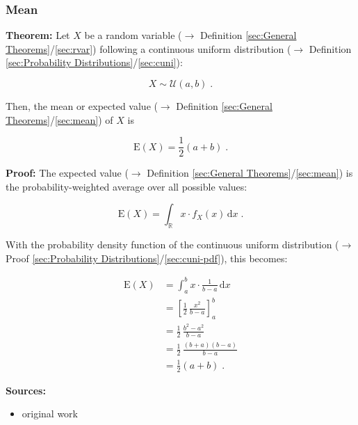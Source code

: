 \documentclass[a4paper,12pt,twoside]{book}
\begin{document}
\subsubsection[\textbf{Mean}]{Mean} \label{sec:cuni-mean}
\setcounter{equation}{0}

\textbf{Theorem:} Let $X$ be a random variable ($\rightarrow$ Definition \ref{sec:General Theorems}/\ref{sec:rvar}) following a continuous uniform distribution ($\rightarrow$ Definition \ref{sec:Probability Distributions}/\ref{sec:cuni}):

\begin{equation} \label{eq:cuni-mean-cuni}
X \sim \mathcal{U}(a, b) \; .
\end{equation}

Then, the mean or expected value ($\rightarrow$ Definition \ref{sec:General Theorems}/\ref{sec:mean}) of $X$ is

\begin{equation} \label{eq:cuni-mean-cuni-mean}
\mathrm{E}(X) = \frac{1}{2} (a+b) \; .
\end{equation}


\vspace{1em}
\textbf{Proof:} The expected value ($\rightarrow$ Definition \ref{sec:General Theorems}/\ref{sec:mean}) is the probability-weighted average over all possible values:

\begin{equation} \label{eq:cuni-mean-mean}
\mathrm{E}(X) = \int_{\mathbb{R}} x \cdot f_X(x) \, \mathrm{d}x \; .
\end{equation}

With the probability density function of the continuous uniform distribution ($\rightarrow$ Proof \ref{sec:Probability Distributions}/\ref{sec:cuni-pdf}), this becomes:

\begin{equation} \label{eq:cuni-mean-cuni-mean-qed}
\begin{split}
\mathrm{E}(X) &= \int_a^b x \cdot \frac{1}{b-a} \, \mathrm{d}x \\
&= \left[ \frac{1}{2} \, \frac{x^2}{b-a} \right]_a^b \\
&= \frac{1}{2} \, \frac{b^2 - a^2}{b-a} \\
&= \frac{1}{2} \, \frac{(b+a)(b-a)}{b-a} \\
&= \frac{1}{2} (a+b) \; .
\end{split}
\end{equation}


\vspace{1em}
\textbf{Sources:}
\begin{itemize}
\item original work\end{itemize}
\end{document}

